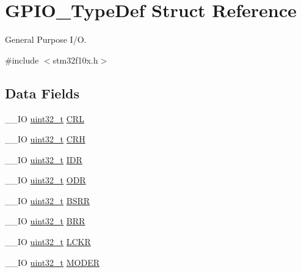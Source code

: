 \hypertarget{struct_g_p_i_o___type_def}{\section{G\-P\-I\-O\-\_\-\-Type\-Def Struct Reference}
\label{struct_g_p_i_o___type_def}
}


General Purpose I/\-O.  




{\ttfamily \#include $<$stm32f10x.\-h$>$}

\subsection*{Data Fields}
\begin{DoxyCompactItemize}
\item 
\-\_\-\-\_\-\-I\-O \hyperlink{stdint_8h_a435d1572bf3f880d55459d9805097f62}{uint32\-\_\-t} \hyperlink{struct_g_p_i_o___type_def_a218d21e9ca712cec4ca8f00406b2ec29}{C\-R\-L}
\item 
\-\_\-\-\_\-\-I\-O \hyperlink{stdint_8h_a435d1572bf3f880d55459d9805097f62}{uint32\-\_\-t} \hyperlink{struct_g_p_i_o___type_def_afe53502a3dbf9e7dcf9ac83f67ac481d}{C\-R\-H}
\item 
\-\_\-\-\_\-\-I\-O \hyperlink{stdint_8h_a435d1572bf3f880d55459d9805097f62}{uint32\-\_\-t} \hyperlink{struct_g_p_i_o___type_def_acf11156409414ad8841bb0b62959ee96}{I\-D\-R}
\item 
\-\_\-\-\_\-\-I\-O \hyperlink{stdint_8h_a435d1572bf3f880d55459d9805097f62}{uint32\-\_\-t} \hyperlink{struct_g_p_i_o___type_def_a6fb78f4a978a36032cdeac93ac3c9c8b}{O\-D\-R}
\item 
\-\_\-\-\_\-\-I\-O \hyperlink{stdint_8h_a435d1572bf3f880d55459d9805097f62}{uint32\-\_\-t} \hyperlink{struct_g_p_i_o___type_def_acd6f21e08912b484c030ca8b18e11cd6}{B\-S\-R\-R}
\item 
\-\_\-\-\_\-\-I\-O \hyperlink{stdint_8h_a435d1572bf3f880d55459d9805097f62}{uint32\-\_\-t} \hyperlink{struct_g_p_i_o___type_def_aab918bfbfae459789db1fd0b220c7f21}{B\-R\-R}
\item 
\-\_\-\-\_\-\-I\-O \hyperlink{stdint_8h_a435d1572bf3f880d55459d9805097f62}{uint32\-\_\-t} \hyperlink{struct_g_p_i_o___type_def_a95a59d4b1d52be521f3246028be32f3e}{L\-C\-K\-R}
\item 
\-\_\-\-\_\-\-I\-O \hyperlink{stdint_8h_a435d1572bf3f880d55459d9805097f62}{uint32\-\_\-t} \hyperlink{struct_g_p_i_o___type_def_ac2505d096b6b650f1647b8e0ff8b196b}{M\-O\-D\-E\-R}
\item 

\end{DoxyCompactItemize}
